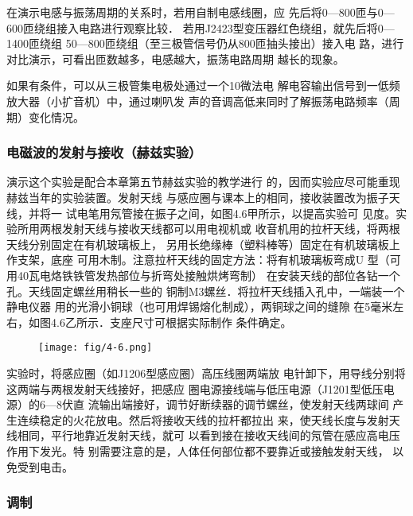 在演示电感与振荡周期的关系时，若用自制电感线圈，应
先后将0—800匝与0—600匝绕组接入电路进行观察比较．
若用J2423型变压器红色绕组，就先后将0—1400匝绕组
50—800匝绕组（至三极管信号仍从800匝抽头接出）接入电
路，进行对比演示，可看出匝数越多，电感越大，振荡电路周期
越长的现象。

如果有条件，可以从三极管集电极处通过一个10微法电
解电容输出信号到一低频放大器（小扩音机）中，通过喇叭发
声的音调高低来同时了解振荡电路频率（周期）变化情况。

\subsubsection{电磁波的发射与接收（赫兹实验）}

演示这个实验是配合本章第五节赫兹实验的教学进行
的，因而实验应尽可能重现赫兹当年的实验装置。发射天线
与感应圈与课本上的相同，接收装置改为振子天线，并将一
试电笔用氖管接在振子之间，如图4.6甲所示，以提高实验可
见度。实验所用两根发射天线与接收天线都可以用电视机或
收音机用的拉杆天线，将两根天线分别固定在有机玻璃板上，
另用长绝缘棒（塑料棒等）固定在有机玻璃板上作支架，底座
可用木制。注意拉杆天线的固定方法：将有机玻璃板弯成U
型（可用40瓦电烙铁铁管发热部位与折弯处接触烘烤弯制）
在安装天线的部位各钻一个孔。天线固定螺丝用稍长一些的
铜制M3螺丝．将拉杆天线插入孔中，一端装一个静电仪器
用的光滑小铜球（也可用焊锡熔化制成），两铜球之间的缝隙
在5毫米左右，如图4.6乙所示．支座尺寸可根据实际制作
条件确定。

\begin{figure}[htp]
    \centering
\texttt{[image: fig/4-6.png]}
    \caption{}
\end{figure}

实验时，将感应圈（如J1206型感应圈）高压线圈两端放
电针卸下，用导线分别将这两端与两根发射天线接好，把感应
圈电源接线端与低压电源（J1201型低压电源）的6—8伏直
流输出端接好，调节好断续器的调节螺丝，使发射天线两球间
产生连续稳定的火花放电。然后将接收天线的拉杆都拉出
来，使天线长度与发射天线相同，平行地靠近发射天线，就可
以看到接在接收天线间的氖管在感应高电压作用下发光。特
别需要注意的是，人体任何部位都不要靠近或接触发射天线，
以免受到电击。

\subsubsection{调制}

